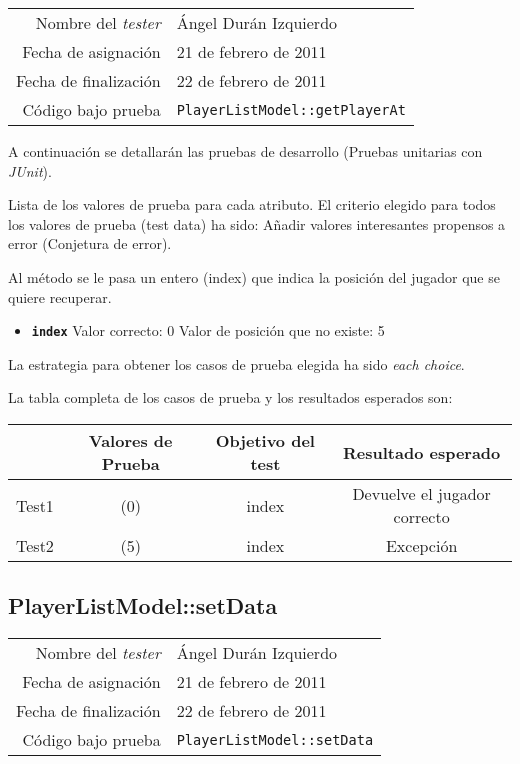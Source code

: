 {\small
\begin{tabular}{r|l}
Nombre del \textit{tester} & \'Angel Dur\'an Izquierdo\\
Fecha de asignación & 21 de febrero de 2011 \\
Fecha de finalización & 22 de febrero de 2011 \\
Código bajo prueba & \texttt{PlayerListModel::getPlayerAt}
\end{tabular}
}

A continuación se detallarán las pruebas de desarrollo (Pruebas unitarias con \textit{JUnit}).

Lista de los valores de prueba para cada atributo.
El criterio elegido para todos los valores de prueba (test data) ha sido: Añadir valores interesantes propensos a error (Conjetura de error).

Al m\'etodo se le pasa un entero (index) que indica la posici\'on del jugador que se quiere recuperar.

\begin{itemize}
\item \textbf{\texttt{index}}
\subitem Valor correcto: 0
\subitem Valor de posici\'on que no existe: 5
\end{itemize}

La estrategia para obtener los casos de prueba elegida ha sido
\textit{each choice}.

La tabla completa de los casos de prueba y los resultados esperados son:

{\footnotesize
\begin{longtable}[c]{lccc}
 & \textbf{Valores de Prueba} & \textbf{Objetivo del test} & \textbf{Resultado esperado} \\
\hline \hline
\endhead

Test1 & (0) & index & Devuelve el jugador correcto\\
Test2 & (5) & index & Excepci\'on\\

\hline
\end{longtable}
}

\subsection{PlayerListModel::setData}

{\small
\begin{tabular}{r|l}
Nombre del \textit{tester} & \'Angel Dur\'an Izquierdo\\
Fecha de asignación & 21 de febrero de 2011 \\
Fecha de finalización & 22 de febrero de 2011 \\
Código bajo prueba & \texttt{PlayerListModel::setData}
\end{tabular}
}

